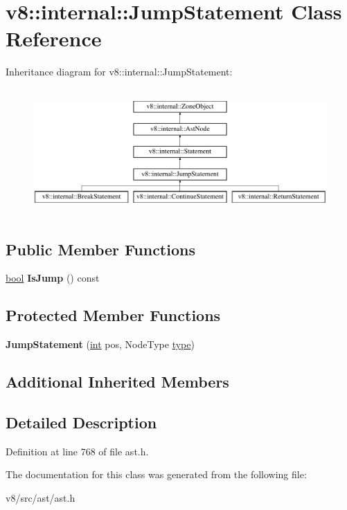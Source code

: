 \hypertarget{classv8_1_1internal_1_1JumpStatement}{}\section{v8\+:\+:internal\+:\+:Jump\+Statement Class Reference}
\label{classv8_1_1internal_1_1JumpStatement}
Inheritance diagram for v8\+:\+:internal\+:\+:Jump\+Statement\+:\begin{figure}[H]
\begin{center}
\leavevmode
\includegraphics[height=4.861111cm]{classv8_1_1internal_1_1JumpStatement}
\end{center}
\end{figure}
\subsection*{Public Member Functions}
\begin{DoxyCompactItemize}
\item 
\mbox{\label{classv8_1_1internal_1_1JumpStatement_ab58189e5460e6cd8d4a53bb2c60afed9}} 
\mbox{\hyperlink{classbool}{bool}} {\bfseries Is\+Jump} () const
\end{DoxyCompactItemize}
\subsection*{Protected Member Functions}
\begin{DoxyCompactItemize}
\item 
\mbox{\label{classv8_1_1internal_1_1JumpStatement_aac40ca299233c9cb010e09d5b31c35e2}} 
{\bfseries Jump\+Statement} (\mbox{\hyperlink{classint}{int}} pos, Node\+Type \mbox{\hyperlink{classstd_1_1conditional_1_1type}{type}})
\end{DoxyCompactItemize}
\subsection*{Additional Inherited Members}


\subsection{Detailed Description}


Definition at line 768 of file ast.\+h.



The documentation for this class was generated from the following file\+:\begin{DoxyCompactItemize}
\item 
v8/src/ast/ast.\+h\end{DoxyCompactItemize}
